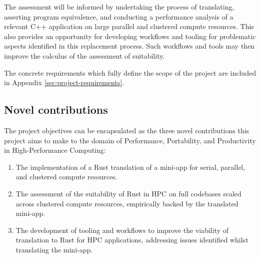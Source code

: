 The assessment will be informed by undertaking the process of translating, asserting program equivalence, and conducting a performance analysis of a relevant C++ application on large parallel and clustered compute resources. This also provides an opportunity for developing workflows and tooling for problematic aspects identified in this replacement process. Such workflows and tools may then improve the calculus of the assessment of suitability.

The concrete requirements which fully define the scope of the project are included in Appendix \ref{sec:project-requirements}.

\subsection{Novel contributions}
\label{ssec:objectives-novel-contributions}

The project objectives can be encapsulated as the three novel contributions this project aims to make to the domain of Performance, Portability, and Productivity in High-Performance Computing:

\begin{enumerate}
    \item The implementation of a Rust translation of a mini-app for serial, parallel, and clustered compute resources.
    \item The assessment of the suitability of Rust in HPC on full codebases scaled across clustered compute resources, empirically backed by the translated mini-app.
    \item The development of tooling and workflows to improve the viability of translation to Rust for HPC applications, addressing issues identified whilst translating the mini-app.
\end{enumerate}
